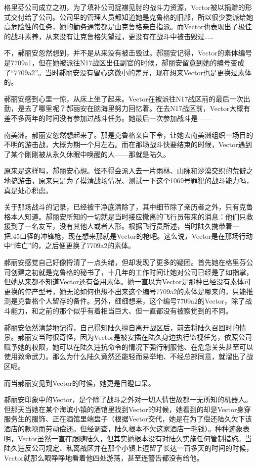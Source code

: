 格里芬公司成立之初，为了填补公司捉襟见肘的战斗力资源，Vector被以捐赠的形式交付给了公司。公司里的管理人员都知道她是克鲁格的旧部，所以很少委派给她高危险性的任务，她的勤务通常都是由克鲁格亲自指派。而Vector也表现出了极佳的战斗素养，从来没有让克鲁格失望过，更没有在战斗中被击毁过……

不，郝丽安忽然想到，并不是从来没有被击毁过。郝丽安记得，Vector的素体编号是7709a1，但在她被派往N17战区出任副官的时候，郝丽安留意到她的编号变成了“7709a2”。当时郝丽安没有留心这微小的差异，现在想来Vector也是更换过素体的。

郝丽安感到心里一惊，从床上坐了起来。Vector在被派往N17战区前的最后一次出勤，是去了哪里呢？郝丽安在脑海里努力回忆着。在去N17战区前，Vector大概有差不多两年的时间没有参加过战斗任务。她最后一次参加战斗是——

南美洲。郝丽安忽然想起来了。那是克鲁格亲自下令，让她去南美洲组织一场目的不明的游击战，大概为期一个月左右。而在那场战斗快要结束的时候，Vector遇到了某个刚刚被从永久休眠中唤醒的人——那就是陆久。

原来是这样吗，郝丽安心想。怪不得会派人去一片雨林、山脉和沙漠交织的荒僻之地搞游击，原来只是为了摸清战场情况、测试一下这个1069号罪犯的战斗能力吗，真是处心积虑。

关于那场战斗的记录，已经被干净底清除了，其中细节除了亲历者之外，只有克鲁格本人知道。郝丽安所知的一切就是当时接应撤离的飞行员带来的消息：他们只救援到了一名友军，没有其他人或者人形。根据飞行员所述，当时陆久携带着一把.45口径的冲锋枪，现在想来那就是Vector的枪吧。这么说，Vector是在那场行动中“阵亡”的，之后便更换了7709a2的素体。

郝丽安感觉自己好像捋清了一点头绪，但却发现了更多的疑团。首先她在格里芬公司创建之初就是克鲁格的秘书了，十几年的工作时间让她对公司已经是了如指掌，但她从来都不知道Vector还有备用素体。她一直以为Vector是那种已经没有素体可更换的停产型号，她无论如何也想不出来这个编号7709a2的素体是哪来的，只能推测是克鲁格个人留存的备件。另外，细细想来，这个编号7709a2的Vector，除了战斗能力，和之前的那个似乎有着相当巨大、但一直都没有被察觉到的不同。

郝丽安依然清楚地记得，自己得知陆久擅自离开战区后，前去将陆久召回时的情景。郝丽安当时很奇怪，因为Vector是被安插在陆久身边执行监视任务，依照公司赋予她的权限，她可以在陆久违抗命令的情况下强行制服他、在危急关头甚至可以使用致命武力。那么为什么陆久竟然还能轻而易举地、不经总部同意，就溜出了战区呢。

而当郝丽安见到Vector的时候，她更是目瞪口呆。

郝丽安印象中的Vector，是个除了战斗之外对一切人情世故都一无所知的机器人。但那天当她在某个海滨小镇的酒馆里找到Vector的时候，她看到的却是Vector身穿服务生的服饰、正在酒馆里端盘子（根据Vector交代，她是在为了偿还陆久欠下该酒店的款项而劳动偿还。但经调查，陆久根本不欠这家酒店一毛钱）。种种迹象表明，Vector虽然一直在跟随陆久，但其实她根本没有对陆久实施任何管制措施。当陆久违反公司规定、私离战区并在那个小镇上逗留了长达一百多天的时间的时候，Vector就那么眼睁睁地看着他四处游荡，甚至连警告都没有给他。

